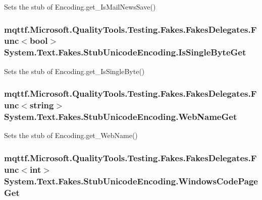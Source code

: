 Sets the stub of Encoding.\-get\-\_\-\-Is\-Mail\-News\-Save()

\hypertarget{class_system_1_1_text_1_1_fakes_1_1_stub_unicode_encoding_a623e82d0f89c13affb7ce2004f43473c}{
\subsubsection[{Is\-Single\-Byte\-Get}]{\setlength{\rightskip}{0pt plus 5cm}mqttf.\-Microsoft.\-Quality\-Tools.\-Testing.\-Fakes.\-Fakes\-Delegates.\-Func$<$bool$>$ System.\-Text.\-Fakes.\-Stub\-Unicode\-Encoding.\-Is\-Single\-Byte\-Get}}\label{class_system_1_1_text_1_1_fakes_1_1_stub_unicode_encoding_a623e82d0f89c13affb7ce2004f43473c}


Sets the stub of Encoding.\-get\-\_\-\-Is\-Single\-Byte()

\hypertarget{class_system_1_1_text_1_1_fakes_1_1_stub_unicode_encoding_af27c104e52977c77c7042de2599eab38}{
\subsubsection[{Web\-Name\-Get}]{\setlength{\rightskip}{0pt plus 5cm}mqttf.\-Microsoft.\-Quality\-Tools.\-Testing.\-Fakes.\-Fakes\-Delegates.\-Func$<$string$>$ System.\-Text.\-Fakes.\-Stub\-Unicode\-Encoding.\-Web\-Name\-Get}}\label{class_system_1_1_text_1_1_fakes_1_1_stub_unicode_encoding_af27c104e52977c77c7042de2599eab38}


Sets the stub of Encoding.\-get\-\_\-\-Web\-Name()

\hypertarget{class_system_1_1_text_1_1_fakes_1_1_stub_unicode_encoding_a51660eae2d2ea4cee4743ed950b62349}{
\subsubsection[{Windows\-Code\-Page\-Get}]{\setlength{\rightskip}{0pt plus 5cm}mqttf.\-Microsoft.\-Quality\-Tools.\-Testing.\-Fakes.\-Fakes\-Delegates.\-Func$<$int$>$ System.\-Text.\-Fakes.\-Stub\-Unicode\-Encoding.\-Windows\-Code\-Page\-Get}}\label{class_system_1_1_text_1_1_fakes_1_1_stub_unicode_encoding_a51660eae2d2ea4cee4743ed950b62349}


